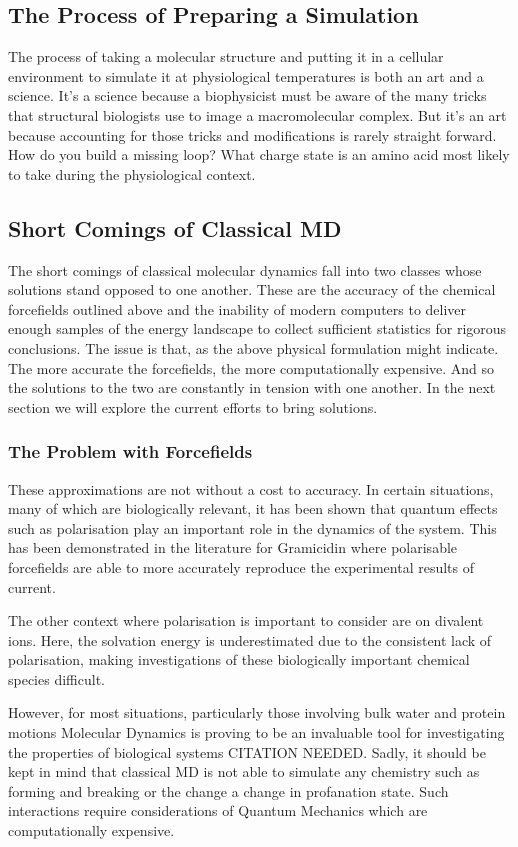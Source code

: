 \subsection{The Process of Preparing a Simulation}
The process of taking a molecular structure and putting it in a cellular environment to simulate it at physiological temperatures is both an art and a science. It's a science because a biophysicist must be aware of the many tricks that structural biologists use to image a macromolecular complex. But it's an art because accounting for those tricks and modifications is rarely straight forward. How do you build a missing loop? What charge state is an amino acid most likely to take during the physiological context.

\subsection{Short Comings of Classical MD}
The short comings of classical molecular dynamics fall into two classes whose solutions stand opposed to one another. These are the accuracy of the chemical forcefields outlined above and the inability of modern computers to deliver enough samples of the energy landscape to collect sufficient statistics for rigorous conclusions. The issue is that, as the above physical formulation might indicate. The more accurate the forcefields, the more computationally expensive. And so the solutions to the two are constantly in tension with one another. In the next section we will explore the current efforts to bring solutions.

\subsubsection{The Problem with Forcefields}
These approximations are not without a cost to accuracy. In certain situations, many of which are biologically relevant, it has been shown that quantum effects such as polarisation play an important role in the dynamics of the system. This has been demonstrated in the literature for Gramicidin where polarisable forcefields are able to more accurately reproduce the experimental results of current.

The other context where polarisation is important to consider are on divalent ions. Here, the solvation energy is underestimated due to the consistent lack of polarisation, making investigations of these biologically important chemical species difficult.

However, for most situations, particularly those involving bulk water and protein motions Molecular Dynamics is proving to be an invaluable tool for investigating the properties of biological systems CITATION NEEDED. Sadly, it should be kept in mind that classical MD is not able to simulate any chemistry such as forming and breaking or the change a change in profanation state. Such interactions require considerations of Quantum Mechanics which are computationally expensive.

